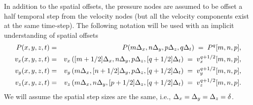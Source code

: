 In addition to the spatial offsets, the pressure nodes are assumed to
be offset a half temporal step from the velocity nodes (but all the
velocity components exist at the same time-step).  The following
notation will be used with an implicit understanding of spatial
offsets
\begin{eqnarray}
P(x,y,z,t) & = & P(m\Delta_x,n \Delta_y, p \Delta_z, q\Delta_t) \;=\;
 P^q[m,n,p],
 \label{eq:p-diff}\\
v_x(x,y,z,t) & = & 
  v_x\left([m+1/2]\Delta_x,n \Delta_y, p \Delta_z, [q+1/2]\Delta_t\right)
  \;=\; v_x^{q+1/2}[m,n,p], \\
v_y(x,y,z,t) & = & 
  v_y\left(m\Delta_x,[n+1/2] \Delta_y, p \Delta_z, [q+1/2]\Delta_t\right)
  \;=\; v_y^{q+1/2}[m,n,p], \\
v_z(x,y,z,t) & = & 
  v_z\left(m\Delta_x,n \Delta_y, [p+1/2] \Delta_z, [q+1/2]\Delta_t\right)
  \;=\; v_z^{q+1/2}[m,n,p]. \label{eq:vz-diff}
\end{eqnarray}
We will assume the spatial step sizes are the same, i.e., $\Delta_x =
\Delta_y = \Delta_z = \delta$.


